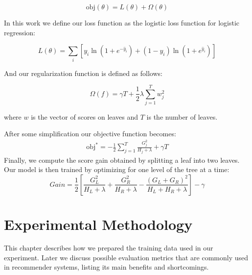 \documentclass[cic,tc,english]{iiufrgs}
\begin{document}
$$\text{obj}(\theta) = L(\theta) + \Omega(\theta)$$

In this work we define our loss function as the logistic loss function for logistic regression:

$$L(\theta) = \sum_i[ y_i\ln (1+e^{-\hat{y}_i}) + (1-y_i)\ln (1+e^{\hat{y}_i})]$$

And our regularization function is defined as follows:

$$\Omega(f) = \gamma T + \frac{1}{2}\lambda \sum_{j=1}^T w_j^2$$

where \(w\) is the vector of scores on leaves and \(T\) is the number of leaves.

After some simplification our objective function becomes:
$$
\begin{split}
\text{obj}^\ast = -\frac{1}{2} \sum_{j=1}^T \frac{G_j^2}{H_j+\lambda} + \gamma T
\end{split}
$$
Finally, we compute the score gain obtained by splitting a leaf into two leaves. Our model is then trained by optimizing for one level of the tree at a time:
$$
Gain = \frac{1}{2} \left[\frac{G_L^2}{H_L+\lambda}+\frac{G_R^2}{H_R+\lambda}-\frac{(G_L+G_R)^2}{H_L+H_R+\lambda}\right] - \gamma
$$

\chapter{Experimental Methodology}
This chapter describes how we prepared the training data used in our experiment. Later we discuss possible evaluation metrics that are commonly used in recommender systems, listing its main benefits and shortcomings.
\end{document}
